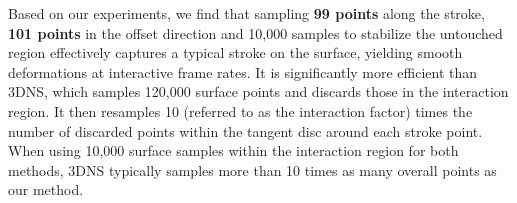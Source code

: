 Based on our experiments, we find that sampling \textbf{99 points} along the stroke, \textbf{101 points} in the offset direction and 10,000 samples to stabilize the untouched region effectively captures a typical stroke on the surface, yielding smooth deformations at interactive frame rates. It is significantly more efficient than 3DNS, which samples 120,000 surface points and discards those in the interaction region. It then resamples 10 (referred to as the interaction factor) times the number of discarded points within the tangent disc around each stroke point. When using 10,000 surface samples within the interaction region for both methods, 3DNS typically samples more than 10 times as many overall points as our method. 




